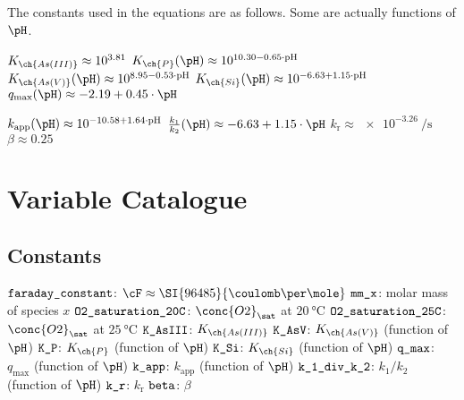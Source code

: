 \documentclass[11pt]{scrartcl} %
\begin{document}
            The constants used in the equations are as follows. Some are actually functions of $\pH$.
            \begin{multicols}{2}
                \begin{itemize}
                    \ii $K_{\ch{As (III)}} \approx 10^{3.81}$
                    \ii $K_{\ch{P}}(\pH) \approx 10^{10.30 -0.65 \cdot \mathrm{pH}}$
                    \ii $K_{\ch{As (V)}}(\pH) \approx 10^{8.95 -0.53 \cdot \mathrm{pH}}$
                    \ii $K_{\ch{Si}}(\pH) \approx 10^{-6.63 + 1.15\cdot \mathrm{pH}}$
                    \ii $q_{\max}(\pH) \approx -2.19 + 0.45 \cdot \pH$

                    \columnbreak
                    \ii $k_{\mathrm{app}}(\pH) \approx 10^{-10.58 + 1.64\cdot \mathrm{pH}}$
                    \ii $\frac{k_1}{k_2}(\pH) \approx -6.63 + 1.15\cdot \pH$
                    \ii $k_{\mathrm{r}} \approx \SI{e-3.26}{\per\second}$
                    \ii $\beta \approx 0.25$
                \end{itemize}
            \end{multicols}

    \section{Variable Catalogue}

        \subsection{Constants}
        \begin{multicols}{3}
            \begin{itemize}
                \ii $\verb|faraday_constant|$: $\cF \approx \SI{96485}{\coulomb\per\mole}$
                \ii $\verb|mm_x|$: molar mass of species $x$
                \ii $\verb|O2_saturation_20C|$: $\conc{O2}_\sat$ at $\SI{20}{\celsius}$
                \ii $\verb|O2_saturation_25C|$: $\conc{O2}_\sat$ at $\SI{25}{\celsius}$
                \ii $\verb|K_AsIII|$: $K_{\ch{As (III)}}$
                \ii $\verb|K_AsV|$: $K_{\ch{As(V)}}$ (function of $\pH$)
                \ii $\verb|K_P|$: $K_{\ch{P}}$ (function of $\pH$)
                \ii $\verb|K_Si|$: $K_{\ch{Si}}$ (function of $\pH$)
                \ii $\verb|q_max|$: $q_{\max}$ (function of $\pH$)
                \ii $\verb|k_app|$: $k_{\mathrm{app}}$ (function of $\pH$)
                \ii $\verb|k_1_div_k_2|$: $k_1/k_2$ (function of $\pH$)
                \ii $\verb|k_r|$: $k_{\mathrm{r}}$
                \ii $\verb|beta|$: $\beta$
            \end{itemize}
        \end{multicols}
\end{document}
